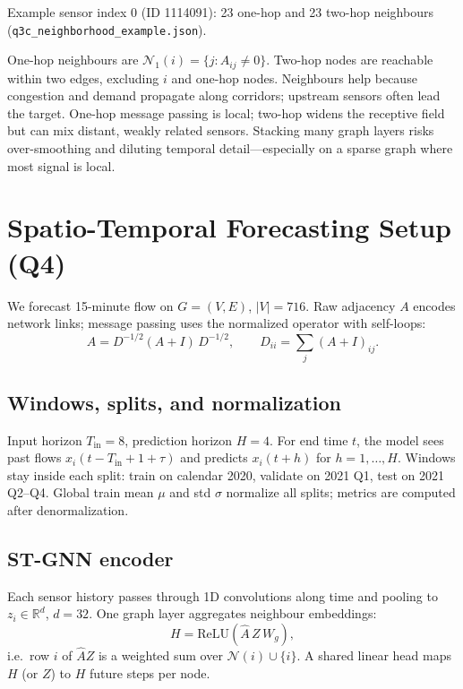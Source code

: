 Example sensor index 0 (ID 1114091): 23 one-hop and 23 two-hop neighbours (\texttt{q3c\_neighborhood\_example.json}).

One-hop neighbours are $\mathcal{N}_1(i) = \{ j : A_{ij} \neq 0 \}$.
Two-hop nodes are reachable within two edges, excluding $i$ and one-hop nodes.
Neighbours help because congestion and demand propagate along corridors; upstream sensors often lead the target.
One-hop message passing is local; two-hop widens the receptive field but can mix distant, weakly related sensors.
Stacking many graph layers risks over-smoothing and diluting temporal detail---especially on a sparse graph where most signal is local.

\section{Spatio-Temporal Forecasting Setup (Q4)}

We forecast 15-minute flow on $G=(V,E)$, $|V|=716$.
Raw adjacency $A$ encodes network links; message passing uses the normalized operator with self-loops:
\begin{equation}
  \hat{A} = D^{-1/2}(A + I)\,D^{-1/2}, \qquad D_{ii} = \sum_j (A+I)_{ij}.
\end{equation}

\subsection{Windows, splits, and normalization}

Input horizon $T_{\mathrm{in}}=8$, prediction horizon $H=4$.
For end time $t$, the model sees past flows $x_i(t - T_{\mathrm{in}} + 1 + \tau)$ and predicts $x_i(t+h)$ for $h=1,\ldots,H$.
Windows stay inside each split: train on calendar 2020, validate on 2021 Q1, test on 2021 Q2--Q4.
Global train mean $\mu$ and std $\sigma$ normalize all splits; metrics are computed after denormalization.

\subsection{ST-GNN encoder}

Each sensor history passes through 1D convolutions along time and pooling to $z_i \in \mathbb{R}^{d}$, $d=32$.
One graph layer aggregates neighbour embeddings:
\begin{equation}
  H = \mathrm{ReLU}\!\left(\hat{A}\, Z\, W_g\right),
\end{equation}
i.e.\ row $i$ of $\hat{A}Z$ is a weighted sum over $\mathcal{N}(i)\cup\{i\}$.
A shared linear head maps $H$ (or $Z$) to $H$ future steps per node.

